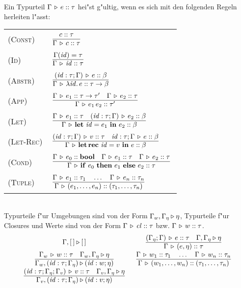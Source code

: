 \documentclass[12pt,fleqn,a4paper]{article}
\newcommand{\RN}[1]{\mbox{\textsc{(#1)}}}
\newcommand{\cl}{\name{cl}}
\begin{document}
\begin{definition}[Typregeln]
  Ein Typurteil $\Gamma \, \triangleright \, e\mathrel{::}\tau$ hei"st g"ultig, wenn es sich mit den folgenden Regeln herleiten l"asst: \\[5mm]
  \begin{tabular}{ll}
    \RN{Const}   & $\regel{\tj{c}{\tau}}
                          {\Tj{\Gamma}{c}{\tau}}$ \\[3mm]
    \RN{Id}      & $\regel{\Gamma(\id) = \tau}
                          {\Tj{\Gamma}{\id}{\tau}}$ \\[3mm]
    \RN{Abstr}   & $\regel{\Tj{(\id:\tau;\Gamma)}{e}{\beta}}
                          {\Tj{\Gamma}{\abstr{\id}{e}}{\tau \to \beta}}$ \\[3mm]
    \RN{App}     & $\regel{\Tj{\Gamma}{e_1}{\tau \to \tau'} \quad \Tj{\Gamma}{e_2}{\tau}}
                          {\Tj{\Gamma}{\app{e_1}{e_2}}{\tau'}}$ \\[3mm]
    \RN{Let}     & $\regel{\Tj{\Gamma}{e_1}{\tau} \quad \Tj{(\id:\tau;\Gamma)}{e_2}{\beta}}
                          {\Tj{\Gamma}{\bli{\id}{e_1}{e_2}}{\beta}}$ \\[3mm]
    \RN{Let-Rec} & $\regel{\Tj{(\id:\tau;\Gamma)}{v}{\tau} \quad \Tj{\id:\tau;\Gamma}{e}{\beta}}
                          {\Tj{\Gamma}{\blri{\id}{v}{e}}{\beta}}$ \\[3mm]
    \RN{Cond}    & $\regel{\Tj{\Gamma}{e_0}{\bool} \quad \Tj{\Gamma}{e_1}{\tau} \quad \Tj{\Gamma}{e_2}{\tau}}
                          {\Tj{\Gamma}{\bifte{e_0}{e_1}{e_2}}{\tau}}$ \\[3mm]
    \RN{Tuple}   & $\regel{\Tj{\Gamma}{e_1}{\tau_1} \quad \ldots \quad \Tj{\Gamma}{e_n}{\tau_n}}
                          {\Tj{\Gamma}{(e_1,\ldots,e_n)}{(\tau_1,\ldots,\tau_n)}}$ \\[3mm]
  \end{tabular} \\[2mm]
  Typurteile f"ur Umgebungen sind von der Form $\Gamma_w,\Gamma_\eta \triangleright \eta$, Typurteile f"ur Closures und
  Werte sind von der Form $\Tj{\Gamma}{\cl}{\tau}$ bzw. $\Gamma \, \triangleright \, w\mathrel{::}\tau$.
  \[\begin{array}{cc}
    \Tjh{\Gamma,[\,]}{[\,]}
    & \regel{\Tj{(\Gamma_\eta;\Gamma)}{e}{\tau} \quad \Tjh{\Gamma,\Gamma_\eta}{\eta}}{\Tj{\Gamma}{(e,\eta)}{\tau}} \\
    \regel{\Tj{\Gamma_w}{w}{\tau} \quad \Tjh{\Gamma_w,\Gamma_\eta}{\eta}}{\Tjh{\Gamma_w,(\id:\tau;\Gamma_\eta)}{(\id:w;\eta)}}
    & \regel{\Tj{\Gamma}{w_1}{\tau_1} \quad \ldots \quad \Tj{\Gamma}{w_n}{\tau_n}}{\Tj{\Gamma}{(w_1,\ldots,w_n)}{(\tau_1,\ldots,\tau_n)}} \\
    \regel{\Tj{(\id:\tau;\Gamma_\eta;\Gamma_v)}{v}{\tau} \quad \Tjh{\Gamma_v,\Gamma_\eta}{\eta}}{\Tjh{\Gamma_v,(\id:\tau;\Gamma_\eta)}{(\id:v;\eta)}}
  \end{array}\]
\end{definition}
\end{document}
